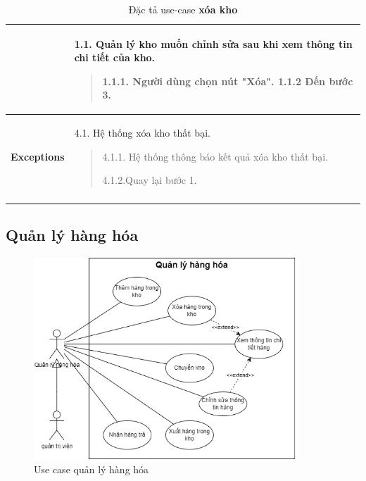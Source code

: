 {\begin{longtable}{| p{} | p{} |}
\begin{flushleft}
                \end{flushleft}
                & 
                1.1. Quản lý kho muốn chỉnh sửa sau khi xem thông tin chi tiết của kho.
                    \begin{quote}
                    1.1.1. Người dùng chọn nút "Xóa".
                        1.1.2 Đến bước 3.
                    \end{quote}
                \\
                \hline
                \begin{flushleft}
                \textbf{Exceptions} 
                \end{flushleft}
                &
                4.1. Hệ thống xóa kho thất bại.
                    \begin{quote}
                    4.1.1. Hệ thống thông báo kết quả xóa kho thất bại.
                    
                    4.1.2.Quay lại bước 1.
                    \end{quote}
                \\
                \hline
                \caption{Đặc tả use-case \textbf{xóa kho}}
            \end{longtable}
        }
    


    \subsection{Quản lý hàng hóa}
        \begin{figure}[!htp]
            \centering
            \includegraphics[width=10cm]{img/UseCase/UseCase-Quản lý hàng.drawio.png}
            \newline
            \caption{Use case quản lý hàng hóa}
        \end{figure}
        
